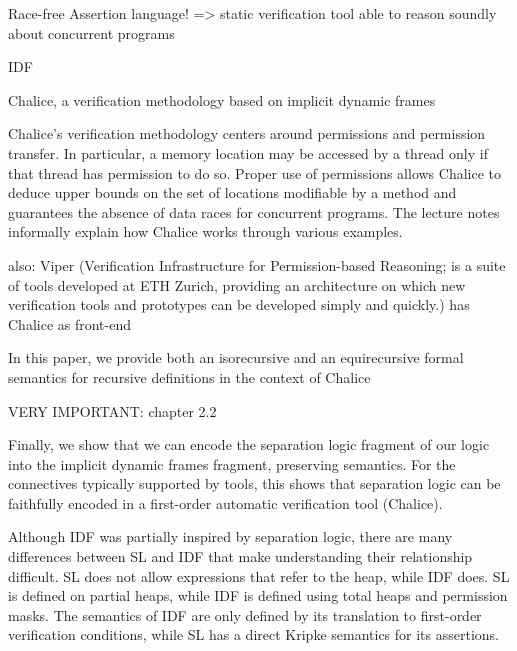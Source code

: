 

Race-free Assertion language! => static verification tool able to reason soundly about concurrent programs


\cite{smans2009implicit}
IDF


\cite{leino2009verification}
Chalice, a verification methodology based on implicit dynamic frames

Chalice’s verification methodology centers around permissions and permission transfer. In particular, a memory location may be accessed by a thread only if that thread has permission to do so. Proper use of permissions allows Chalice to deduce upper bounds on the set of locations modifiable by a method and guarantees the absence of data races for concurrent programs. The lecture notes informally explain how Chalice works through various examples.

also: Viper (Verification Infrastructure for Permission-based Reasoning; is a suite of tools developed at ETH Zurich, providing an architecture on which new verification tools and prototypes can be developed simply and quickly.) has Chalice as front-end

\cite{summers2013formal}
In this paper, we provide both an isorecursive and an equirecursive formal
semantics for recursive definitions in the context of Chalice

\cite{parkinson2011relationship}
VERY IMPORTANT: chapter 2.2

Finally, we show that we can encode the separation
logic fragment of our logic into the implicit dynamic frames fragment, preserving
semantics. For the connectives typically supported by tools, this shows that separation
logic can be faithfully encoded in a first-order automatic verification tool (Chalice).

Although IDF was partially inspired by separation logic, there are many differences
between SL and IDF that make understanding their relationship difficult. SL does not
allow expressions that refer to the heap, while IDF does. SL is defined on partial heaps,
while IDF is defined using total heaps and permission masks. The semantics of IDF are only defined by its translation to first-order verification conditions, while SL has a direct
Kripke semantics for its assertions.

